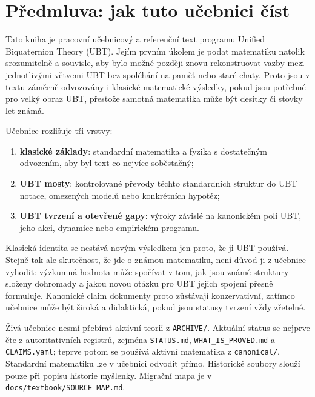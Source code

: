 
\chapter*{Předmluva: jak tuto učebnici číst}

Tato kniha je pracovní učebnicový a referenční text programu Unified
Biquaternion Theory (UBT). Jejím prvním úkolem je podat matematiku natolik
srozumitelně a souvisle, aby bylo možné později znovu rekonstruovat vazby mezi
jednotlivými větvemi UBT bez spoléhání na paměť nebo staré chaty. Proto jsou v
textu záměrně odvozovány i klasické matematické výsledky, pokud jsou potřebné
pro velký obraz UBT, přestože samotná matematika může být desítky či stovky let
známá.

Učebnice rozlišuje tři vrstvy:
\begin{enumerate}
  \item \textbf{klasické základy}: standardní matematika a fyzika s dostatečným
        odvozením, aby byl text co nejvíce soběstačný;
  \item \textbf{UBT mosty}: kontrolované převody těchto standardních struktur
        do UBT notace, omezených modelů nebo konkrétních hypotéz;
  \item \textbf{UBT tvrzení a otevřené gapy}: výroky závislé na kanonickém poli
        UBT, jeho akci, dynamice nebo empirickém programu.
\end{enumerate}

Klasická identita se nestává novým výsledkem jen proto, že ji UBT používá.
Stejně tak ale skutečnost, že jde o známou matematiku, není důvod ji z učebnice
vyhodit: výzkumná hodnota může spočívat v tom, jak jsou známé struktury složeny
dohromady a jakou novou otázku pro UBT jejich spojení přesně formuluje.
Kanonické claim dokumenty proto zůstávají konzervativní, zatímco učebnice může
být široká a didaktická, pokud jsou statusy tvrzení vždy zřetelné.

Živá učebnice nesmí přebírat aktivní teorii z \texttt{ARCHIVE/}. Aktuální
status se nejprve čte z autoritativních registrů, zejména \texttt{STATUS.md},
\texttt{WHAT\_IS\_PROVED.md} a \texttt{CLAIMS.yaml}; teprve potom se používá
aktivní matematika z \texttt{canonical/}. Standardní matematiku lze v učebnici
odvodit přímo. Historické soubory slouží pouze při popisu historie myšlenky.
Migrační mapa je v \texttt{docs/textbook/SOURCE\_MAP.md}.

